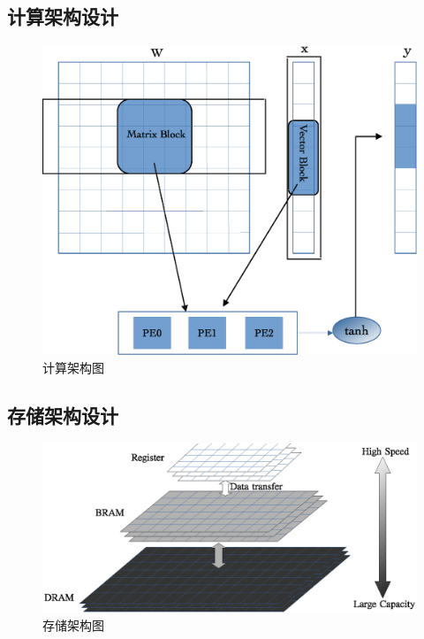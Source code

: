 \subsection{计算架构设计}
\begin{figure}
	\centering
	\includegraphics[width=0.8\columnwidth]{exp/fig_compute.eps}
	\caption{计算架构图}
	\label{fig:compute}
\end{figure}
\subsection{存储架构设计}
\begin{figure}
	\centering
	\includegraphics[width=1\columnwidth]{exp/fig_memory.eps}
	\caption{存储架构图}
	\label{fig:memory}
\end{figure}


